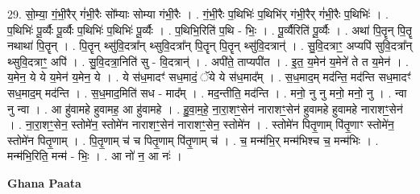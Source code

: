 \documentclass[17pt]{extarticle}
\begin{document}
29. सो॒म्या॒ गं॒भी॒रैर् गं॑भी॒रैः सो᳚म्याः सोम्या गंभी॒रैः । . गं॒भी॒रैः प॒थिभिः॑ प॒थिभि॑र् गंभी॒रैर् गं॑भी॒रैः प॒थिभिः॑ । . प॒थिभिः॑ पू॒र्व्यैः पू॒र्व्यैः प॒थिभिः॑ प॒थिभिः॑ पू॒र्व्यैः । . प॒थिभि॒रिति॑ प॒थि - भिः॒ । . पू॒र्व्यैरिति॑ पू॒र्व्यैः । . अथा॑ पि॒तॄन् पि॒तॄ नथाथा॑ पि॒तॄन् । . पि॒तॄन् थ्सु॑वि॒दत्रा᳚न् थ्सुवि॒दत्रा᳚न् पि॒तॄन् पि॒तॄन् थ्सु॑वि॒दत्रान्॑ । . सु॒वि॒दत्राꣳ॒॒ अप्यपि॑ सुवि॒दत्रा᳚न् थ्सुवि॒दत्राꣳ॒॒ अपि॑ । . सु॒वि॒दत्रा॒निति॑ सु - वि॒दत्रान्॑ । . अपी॑ते॒ ताप्यपी॑त । . इ॒त॒ य॒मेन॑ य॒मेने॑ ते त य॒मेन॑ । . य॒मेन॒ ये ये य॒मेन॑ य॒मेन॒ ये । . ये स॑ध॒मादꣳ॑ सध॒मादं॒ ॅये ये स॑ध॒माद᳚म् । . स॒ध॒माद॒म् मद॑न्ति॒ मद॑न्ति सध॒मादꣳ॑ सध॒माद॒म् मद॑न्ति । . स॒ध॒माद॒मिति॑ सध - माद᳚म् । . मद॒न्तीति॒ मद॑न्ति । . मनो॒ नु नु मनो॒ मनो॒ नु । . न्वा नु न्वा । . आ हु॑वामहे हुवामह॒ आ हु॑वामहे । . हु॒वा॒म॒हे॒ ना॒रा॒शꣳ॒॒सेन॑ नाराशꣳ॒॒सेन॑ हुवामहे हुवामहे नाराशꣳ॒॒सेन॑ । . ना॒रा॒शꣳ॒॒सेन॒ स्तोमे॑न॒ स्तोमे॑न नाराशꣳ॒॒सेन॑ नाराशꣳ॒॒सेन॒ स्तोमे॑न । . स्तोमे॑न पितृ॒णाम् पि॑तृ॒णाꣳ स्तोमे॑न॒ स्तोमे॑न पितृ॒णाम् । . पि॒तृ॒णाम् च॑ च पितृ॒णाम् पि॑तृ॒णाम् च॑ । . च॒ मन्म॑भि॒र् मन्म॑भिश्च च॒ मन्म॑भिः । . मन्म॑भि॒रिति॒ मन्म॑ - भिः॒ । . आ नो॑ न॒ आ नः॑ । \newline

\textbf{Ghana Paata } \newline
\end{document}
